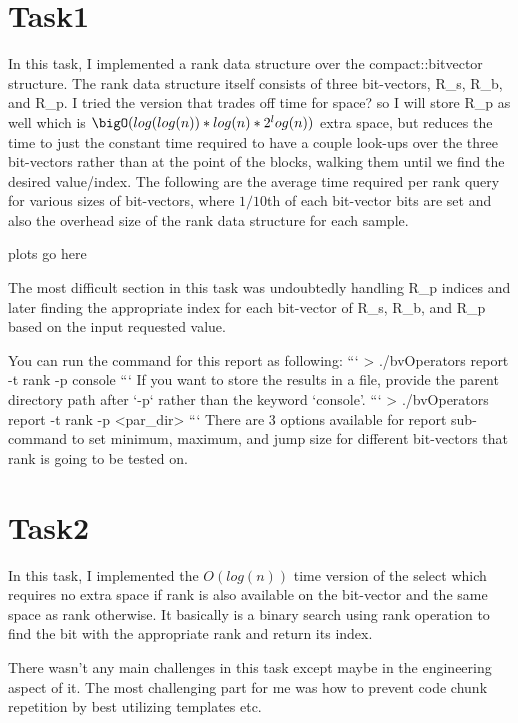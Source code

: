 \documentclass[11pt]{article}
\begin{document}
    \section{Task1}
    In this task, I implemented a rank data structure over the compact::bitvector structure.
    The rank data structure itself consists of three bit-vectors, R_s, R_b, and R_p. I tried the version that
    trades off time for space? so I will store R_p as well which is $\bigO(log(log(n))*log(n)*2^log(n))$ extra space,
    but reduces the time to just the constant time required to have a couple look-ups over the three bit-vectors
    rather than at the point of the blocks, walking them until we find the desired value/index.
    The following are the average time required per rank query for various sizes of bit-vectors,
    where $1/10$th of each bit-vector bits are set and also the overhead size of the rank data structure for each sample.


    plots go here



    The most difficult section in this task was undoubtedly handling R_p indices and later finding the appropriate index
    for each bit-vector of R_s, R_b, and R_p based on the input requested value.

    You can run the command for this report as following:
    ```
    > ./bvOperators report -t rank -p console
    ```
    If you want to store the results in a file, provide the parent directory path after `-p` rather than the keyword `console'.
    ```
    > ./bvOperators report -t rank -p <par_dir>
    ```
    There are 3 options available for report sub-command to set minimum, maximum, and jump size for different bit-vectors that rank is going to be tested on.

    \section{Task2}
    In this task, I implemented the $O(log(n))$ time version of the select which requires no extra space
    if rank is also available on the bit-vector and the same space as rank otherwise. It basically is
    a binary search using rank operation to find the bit with the appropriate rank and return its index.

    There wasn't any main challenges in this task except maybe in the engineering aspect of it.
    The most challenging part for me was how to prevent code chunk repetition by best utilizing templates
    etc.
\end{document}
